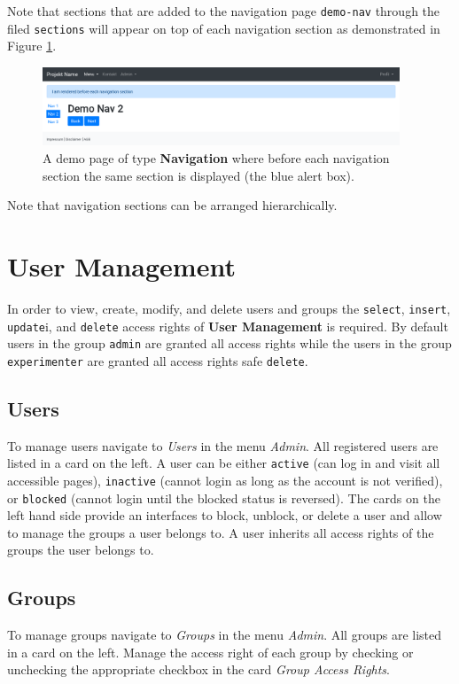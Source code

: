 \documentclass[a4paper,oneside]{book}
\begin{document}
Note that sections that are added to the navigation page \texttt{demo-nav} through the filed \texttt{sections} will appear on top of each navigation section as demonstrated in Figure \ref{fig.demo-nav-page-head}.

\begin{figure}[ht]
    \centering
    \includegraphics[width=0.95\textwidth]{demo-nav-page-head.png}
    \caption{A demo page of type \textbf{Navigation} where before each navigation section the same section is displayed (the blue alert box).}
    \label{fig.demo-nav-page-head}
\end{figure}

Note that navigation sections can be arranged hierarchically.

\chapter{User Management}\label{sec.user}
In order to view, create, modify, and delete users and groups the \texttt{select}, \texttt{insert}, \texttt{update}i, and \texttt{delete} access rights of \textbf{User Management} is required.
By default users in the group \texttt{admin} are granted all access rights while the users in the group \texttt{experimenter} are granted all access rights safe \texttt{delete}.

\section{Users}
To manage users navigate to \emph{Users} in the menu \emph{Admin}.
All registered users are listed in a card on the left.
A user can be either \texttt{active} (can log in and visit all accessible pages), \texttt{inactive} (cannot login as long as the account is not verified), or \texttt{blocked} (cannot login until the blocked status is reversed).
The cards on the left hand side provide an interfaces to block, unblock, or delete a user and allow to manage the groups a user belongs to.
A user inherits all access rights of the groups the user belongs to.

\section{Groups}
To manage groups navigate to \emph{Groups} in the menu \emph{Admin}.
All groups are listed in a card on the left.
Manage the access right of each group by checking or unchecking the appropriate checkbox in the card \emph{Group Access Rights}.
\end{document}
